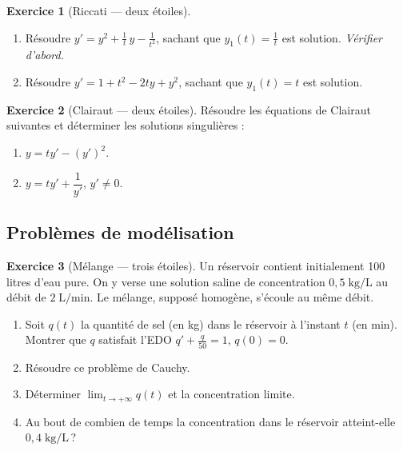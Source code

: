 \documentclass[12pt,a4paper,openany]{book}
\theoremstyle{definition}
\newtheorem{exercice}{Exercice}[chapter]
\theoremstyle{plain}
\theoremstyle{remark}
\begin{document}
\begin{exercice}[Riccati --- deux étoiles]
\label{exo:ch2-riccati}
\begin{enumerate}[label=(\alph*)]
\item Résoudre $y' = y^2 + \frac{1}{t}\,y - \frac{1}{t^2}$, sachant que $y_1(t) = \frac{1}{t}$ est solution. \textit{Vérifier d'abord.}
\item Résoudre $y' = 1 + t^2 - 2ty + y^2$, sachant que $y_1(t) = t$ est solution.
\end{enumerate}
\end{exercice}

\begin{exercice}[Clairaut --- deux étoiles]
\label{exo:ch2-clairaut}
Résoudre les équations de Clairaut suivantes et déterminer les solutions singulières :
\begin{enumerate}[label=(\alph*)]
\item $y = ty' - (y')^2$.
\item $y = ty' + \dfrac{1}{y'}$, $y' \neq 0$.
\end{enumerate}
\end{exercice}

\subsection*{Problèmes de modélisation}

\begin{exercice}[Mélange --- {\small trois étoiles}]
\label{exo:ch2-melange}
Un réservoir contient initialement 100 litres d'eau pure. On y verse une solution saline de concentration $0{,}5\;\mathrm{kg/L}$ au débit de $2\;\mathrm{L/min}$. Le mélange, supposé homogène, s'écoule au même débit.
\begin{enumerate}[label=(\alph*)]
\item Soit $q(t)$ la quantité de sel (en kg) dans le réservoir à l'instant $t$ (en min). Montrer que $q$ satisfait l'EDO $q' + \frac{q}{50} = 1$, $q(0) = 0$.
\item Résoudre ce problème de Cauchy.
\item Déterminer $\lim_{t\to+\infty} q(t)$ et la concentration limite.
\item Au bout de combien de temps la concentration dans le réservoir atteint-elle $0{,}4\;\mathrm{kg/L}$\,?
\end{enumerate}
\end{exercice}
\end{document}
